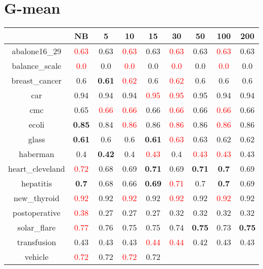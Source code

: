 \documentclass{article}%
\begin{document}
\section*{G{-}mean}%
\begin{tabular}{c|cccccccc}%
\hline%
&NB&5&10&15&30&50&100&200\\%
\hline%
abalone16\_29&\textcolor{red}{ 
0.63
}&0.63&\textcolor{red}{ 
0.63
}&0.63&\textcolor{red}{ 
0.63
}&0.63&\textcolor{red}{ 
0.63
}&0.63\\%
\hline%
balance\_scale&\textcolor{red}{ 
0.0
}&0.0&\textcolor{red}{ 
0.0
}&0.0&\textcolor{red}{ 
0.0
}&0.0&\textcolor{red}{ 
0.0
}&0.0\\%
\hline%
breast\_cancer&0.6&\textbf{0.61}&\textcolor{red}{ 
0.62
}&0.6&\textcolor{red}{ 
0.62
}&0.6&0.6&0.6\\%
\hline%
car&0.94&0.94&0.94&\textcolor{red}{ 
0.95
}&\textcolor{red}{ 
0.95
}&0.95&0.94&0.94\\%
\hline%
cmc&0.65&\textcolor{red}{ 
0.66
}&\textcolor{red}{ 
0.66
}&0.66&\textcolor{red}{ 
0.66
}&0.66&\textcolor{red}{ 
0.66
}&0.66\\%
\hline%
ecoli&\textbf{0.85}&0.84&\textcolor{red}{ 
0.86
}&0.86&\textcolor{red}{ 
0.86
}&0.86&\textcolor{red}{ 
0.86
}&0.86\\%
\hline%
glass&\textbf{0.61}&0.6&0.6&\textbf{0.61}&\textcolor{red}{ 
0.63
}&0.63&0.62&0.62\\%
\hline%
haberman&0.4&\textbf{0.42}&0.4&\textcolor{red}{ 
0.43
}&0.4&\textcolor{red}{ 
0.43
}&\textcolor{red}{ 
0.43
}&0.43\\%
\hline%
heart\_cleveland&\textcolor{red}{ 
0.72
}&0.68&0.69&\textbf{0.71}&0.69&\textbf{0.71}&\textbf{0.7}&0.69\\%
\hline%
hepatitis&\textbf{0.7}&0.68&0.66&\textbf{0.69}&\textcolor{red}{ 
0.71
}&0.7&\textbf{0.7}&0.69\\%
\hline%
new\_thyroid&\textcolor{red}{ 
0.92
}&0.92&\textcolor{red}{ 
0.92
}&0.92&\textcolor{red}{ 
0.92
}&0.92&\textcolor{red}{ 
0.92
}&0.92\\%
\hline%
postoperative&\textcolor{red}{ 
0.38
}&0.27&0.27&0.27&0.32&0.32&0.32&0.32\\%
\hline%
solar\_flare&\textcolor{red}{ 
0.77
}&0.76&0.75&0.75&0.74&\textbf{0.75}&0.73&\textbf{0.75}\\%
\hline%
transfusion&0.43&0.43&0.43&\textcolor{red}{ 
0.44
}&\textcolor{red}{ 
0.44
}&0.42&0.43&0.43\\%
\hline%
vehicle&\textcolor{red}{ 
0.72
}&0.72&\textcolor{red}{ 
0.72
}&0.72&\textcolor{red}{ 
}
\end{tabular}
\end{document}
